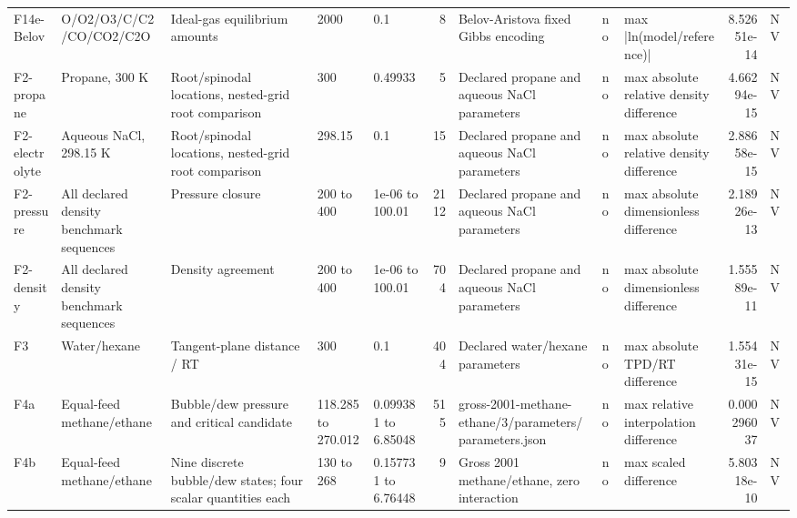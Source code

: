 \begin{landscape}
\begin{longtable}{L{1.9cm}L{2.5cm}L{2.1cm}L{1.6cm}L{1.6cm}rL{2.4cm}L{1.9cm}L{2.2cm}rL{1cm}}
F14e-\allowbreak{}Belov & O/\allowbreak{}O2/\allowbreak{}O3/\allowbreak{}C/\allowbreak{}C2/\allowbreak{}CO/\allowbreak{}CO2/\allowbreak{}C2O & Ideal-\allowbreak{}gas equilibrium amounts & 2000 & 0.1 & 8 & Belov-\allowbreak{}Aristova fixed Gibbs encoding & no & max |ln(model/\allowbreak{}reference)| & 8.52651e-\allowbreak{}14 & NV \\
F2-\allowbreak{}propane & Propane, 300 K & Root/\allowbreak{}spinodal locations, nested-\allowbreak{}grid root comparison & 300 & 0.49933 & 5 & Declared propane and aqueous NaCl parameters & no & max absolute relative density difference & 4.66294e-\allowbreak{}15 & NV \\
F2-\allowbreak{}electrolyte & Aqueous NaCl, 298.15 K & Root/\allowbreak{}spinodal locations, nested-\allowbreak{}grid root comparison & 298.15 & 0.1 & 15 & Declared propane and aqueous NaCl parameters & no & max absolute relative density difference & 2.88658e-\allowbreak{}15 & NV \\
F2-\allowbreak{}pressure & All declared density benchmark sequences & Pressure closure & 200 to 400 & 1e-\allowbreak{}06 to 100.01 & 2112 & Declared propane and aqueous NaCl parameters & no & max absolute dimensionless difference & 2.18926e-\allowbreak{}13 & NV \\
F2-\allowbreak{}density & All declared density benchmark sequences & Density agreement & 200 to 400 & 1e-\allowbreak{}06 to 100.01 & 704 & Declared propane and aqueous NaCl parameters & no & max absolute dimensionless difference & 1.55589e-\allowbreak{}11 & NV \\
F3 & Water/\allowbreak{}hexane & Tangent-\allowbreak{}plane distance /\allowbreak{} RT & 300 & 0.1 & 404 & Declared water/\allowbreak{}hexane parameters & no & max absolute TPD/\allowbreak{}RT difference & 1.55431e-\allowbreak{}15 & NV \\
F4a & Equal-\allowbreak{}feed methane/\allowbreak{}ethane & Bubble/\allowbreak{}dew pressure and critical candidate & 118.285 to 270.012 & 0.099381 to 6.85048 & 515 & gross-\allowbreak{}2001-\allowbreak{}methane-\allowbreak{}ethane/\allowbreak{}3/\allowbreak{}parameters/\allowbreak{}parameters.json & no & max relative interpolation difference & 0.000296037 & NV \\
F4b & Equal-\allowbreak{}feed methane/\allowbreak{}ethane & Nine discrete bubble/\allowbreak{}dew states; four scalar quantities each & 130 to 268 & 0.157731 to 6.76448 & 9 & Gross 2001 methane/\allowbreak{}ethane, zero interaction & no & max scaled difference & 5.80318e-\allowbreak{}10 & NV \\

\end{longtable}
\end{landscape}
